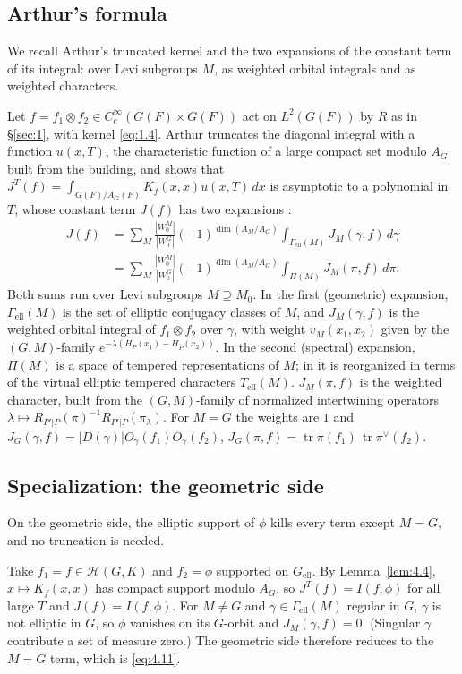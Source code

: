 \documentclass[12pt,letterpaper]{article}
\numberwithin{equation}{section}
\theoremstyle{plain}
\theoremstyle{remark}
\theoremstyle{plain}
\theoremstyle{definition}
\theoremstyle{remark}
\newcounter{rtw}
\theoremstyle{remark}
\newcommand{\Hc}{\mathcal{H}}
\DeclareMathOperator{\tr}{tr}
\newcommand{\ellr}{\mathrm{ell}}
\begin{document}
\subsection{Arthur's formula}\label{sec:7.1}

We recall Arthur's truncated kernel and the two expansions of the constant term of its integral: over Levi subgroups $M$, as weighted orbital integrals and as weighted characters.

Let $f=f_1\otimes f_2\in C_c^\infty(G(F)\times G(F))$ act on $L^2(G(F))$ by $R$ as in \S\ref{sec:1}, with kernel \eqref{eq:1.4}. Arthur truncates the diagonal integral with a function $u(x,T)$, the characteristic function of a large compact set modulo $A_G$ built from the building, and shows that $J^T(f)=\int_{G(F)/A_G(F)}K_f(x,x)u(x,T)\,dx$ is asymptotic to a polynomial in $T$, whose constant term $J(f)$ has two expansions \cite{Ar91}:
\[
\begin{aligned}J(f)&=\sum_{M}\frac{|W_0^M|}{|W_0^G|}(-1)^{\dim(A_M/A_G)}\int_{\Gamma_{\ellr}(M)}J_M(\gamma,f)\,d\gamma\\
&=\sum_{M}\frac{|W_0^M|}{|W_0^G|}(-1)^{\dim(A_M/A_G)}\int_{\Pi(M)}J_M(\pi,f)\,d\pi.
\end{aligned}
\]
Both sums run over Levi subgroups $M\supseteq M_0$. In the first (geometric) expansion, $\Gamma_{\ellr}(M)$ is the set of elliptic conjugacy classes of $M$, and $J_M(\gamma,f)$ is the weighted orbital integral of $f_1\otimes f_2$ over $\gamma$, with weight $v_M(x_1,x_2)$ given by the $(G,M)$-family $e^{-\lambda(H_P(x_1)-H_{\bar P}(x_2))}$. In the second (spectral) expansion, $\Pi(M)$ is a space of tempered representations of $M$; in \cite{Ar93} it is reorganized in terms of the virtual elliptic tempered characters $T_{\ellr}(M)$. $J_M(\pi,f)$ is the weighted character, built from the $(G,M)$-family of normalized intertwining operators $\lambda\mapsto R_{P'|P}(\pi)^{-1}R_{P'|P}(\pi_\lambda)$. For $M=G$ the weights are $1$ and $J_G(\gamma,f)=|D(\gamma)|O_\gamma(f_1)O_\gamma(f_2)$, $J_G(\pi,f)=\tr\pi(f_1)\,\tr\pi^\vee(f_2)$.

\subsection{Specialization: the geometric side}\label{sec:7.2}

On the geometric side, the elliptic support of $\phi$ kills every term except $M=G$, and no truncation is needed.

Take $f_1=f\in\Hc(G,K)$ and $f_2=\phi$ supported on $G_{\ellr}$. By Lemma~\ref{lem:4.4}, $x\mapsto K_f(x,x)$ has compact support modulo $A_G$, so $J^T(f)=I(f,\phi)$ for all large $T$ and $J(f)=I(f,\phi)$. For $M\ne G$ and $\gamma\in\Gamma_{\ellr}(M)$ regular in $G$, $\gamma$ is not elliptic in $G$, so $\phi$ vanishes on its $G$-orbit and $J_M(\gamma,f)=0$. (Singular $\gamma$ contribute a set of measure zero.) The geometric side therefore reduces to the $M=G$ term, which is \eqref{eq:4.11}.
\end{document}
